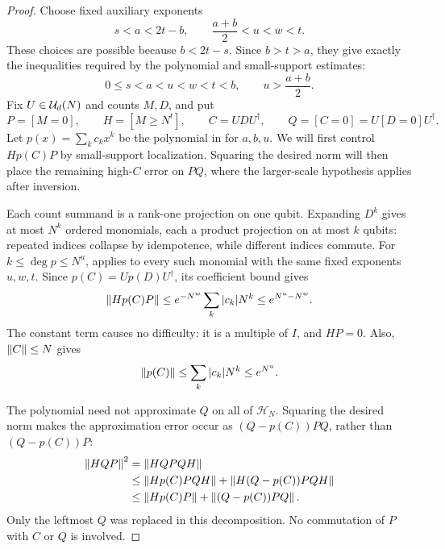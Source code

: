 \begin{proof}
Choose fixed auxiliary exponents
\[
 s<a<2t-b,\qquad \frac{a+b}{2}<u<w<t.
\]
These choices are possible because $b<2t-s$. Since $b>t>a$,
they give exactly the inequalities required by the polynomial and
small-support estimates:
\begin{equation}
\label{eq:step-parameters}
 0\le s<a<u<w<t<b,\qquad u>\frac{a+b}{2}.
\end{equation}
Fix \(U\in\mathcal U_d(N)\) and counts \(M,D\), and put
\[
 P=[M=0],\qquad H=[M\ge N^t],\qquad
 C=UDU^\dagger,\qquad Q=[C=0]=U[D=0]U^\dagger.
\]
Let \(p(x)=\sum_kc_kx^k\) be the polynomial in
 for \(a,b,u\). We will first control
$Hp(C)P$ by small-support localization. Squaring the desired norm
will then place the remaining high-$C$ error on $PQ$, where the
larger-scale hypothesis applies after inversion.

Each count summand is a rank-one projection on one qubit.
Expanding \(D^k\) gives at most \(N^k\) ordered monomials, each a
product projection on at most \(k\) qubits: repeated indices collapse
by idempotence, while different indices commute.
For \(k\le\deg p\le N^u\),  applies to
every such monomial with the same fixed exponents \(u,w,t\).
Since \(p(C)=Up(D)U^\dagger\), its coefficient bound gives
\begin{equation}
\label{eq:polynomial-transition}
 \left\lVert Hp(C)P\right\rVert
 \le e^{-N^w}\sum_k|c_k|N^k
 \le e^{N^u-N^w}.
\end{equation}
The constant term causes no difficulty: it is a multiple of \(I\),
and \(HP=0\). Also, \(\left\lVert C\right\rVert\le N\) gives
\begin{equation}
\label{eq:polynomial-norm}
 \left\lVert p(C)\right\rVert\le\sum_k|c_k|N^k\le e^{N^u}.
\end{equation}

The polynomial need not approximate \(Q\) on all of \(\mathcal H_N\).
Squaring the desired norm makes the approximation error occur as
\((Q-p(C))PQ\), rather than \((Q-p(C))P\):
\begin{align}
\left\lVert HQP\right\rVert^2
 &=\left\lVert HQPQH\right\rVert\notag\\
 &\le \left\lVert Hp(C)PQH\right\rVert+\left\lVert H(Q-p(C))PQH\right\rVert\notag\\
 &\le \left\lVert Hp(C)P\right\rVert+\left\lVert (Q-p(C))PQ\right\rVert.
\label{eq:square}
\end{align}
Only the leftmost \(Q\) was replaced in this decomposition. No commutation
of \(P\) with \(C\) or \(Q\) is involved.


\end{proof}
